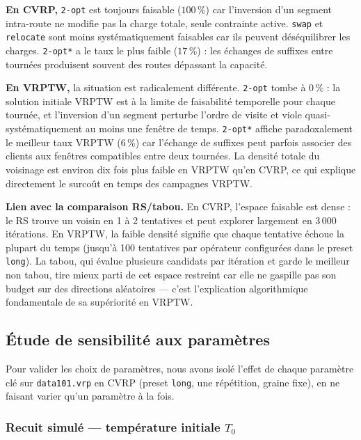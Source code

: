 \documentclass[11pt,a4paper]{article}
\begin{document}
\textbf{En CVRP,} \texttt{2-opt} est toujours faisable ($100\,\%$) car l'inversion d'un segment intra-route ne modifie pas la charge totale, seule contrainte active. \texttt{swap} et \texttt{relocate} sont moins systématiquement faisables car ils peuvent déséquilibrer les charges. \texttt{2-opt*} a le taux le plus faible ($17\,\%$) : les échanges de suffixes entre tournées produisent souvent des routes dépassant la capacité.

\textbf{En VRPTW,} la situation est radicalement différente. \texttt{2-opt} tombe à $0\,\%$ : la solution initiale VRPTW est à la limite de faisabilité temporelle pour chaque tournée, et l'inversion d'un segment perturbe l'ordre de visite et viole quasi-systématiquement au moins une fenêtre de temps. \texttt{2-opt*} affiche paradoxalement le meilleur taux VRPTW ($6\,\%$) car l'échange de suffixes peut parfois associer des clients aux fenêtres compatibles entre deux tournées. La densité totale du voisinage est environ dix fois plus faible en VRPTW qu'en CVRP, ce qui explique directement le surcoût en temps des campagnes VRPTW.

\textbf{Lien avec la comparaison RS/tabou.} En CVRP, l'espace faisable est dense : le RS trouve un voisin en 1 à 2 tentatives et peut explorer largement en 3\,000 itérations. En VRPTW, la faible densité signifie que chaque tentative échoue la plupart du temps (jusqu'à 100 tentatives par opérateur configurées dans le preset \texttt{long}). La tabou, qui évalue plusieurs candidats par itération et garde le meilleur non tabou, tire mieux parti de cet espace restreint car elle ne gaspille pas son budget sur des directions aléatoires — c'est l'explication algorithmique fondamentale de sa supériorité en VRPTW.

\subsection{Étude de sensibilité aux paramètres}

Pour valider les choix de paramètres, nous avons isolé l'effet de chaque paramètre clé sur \texttt{data101.vrp} en CVRP (preset \texttt{long}, une répétition, graine fixe), en ne faisant varier qu'un paramètre à la fois.

\subsubsection*{Recuit simulé — température initiale \(T_0\)}
\end{document}
